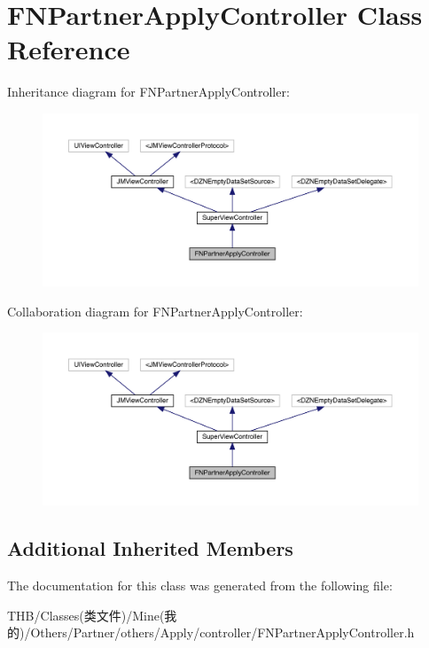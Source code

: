 \hypertarget{interface_f_n_partner_apply_controller}{}\section{F\+N\+Partner\+Apply\+Controller Class Reference}
\label{interface_f_n_partner_apply_controller}


Inheritance diagram for F\+N\+Partner\+Apply\+Controller\+:\nopagebreak
\begin{figure}[H]
\begin{center}
\leavevmode
\includegraphics[width=350pt]{interface_f_n_partner_apply_controller__inherit__graph}
\end{center}
\end{figure}


Collaboration diagram for F\+N\+Partner\+Apply\+Controller\+:\nopagebreak
\begin{figure}[H]
\begin{center}
\leavevmode
\includegraphics[width=350pt]{interface_f_n_partner_apply_controller__coll__graph}
\end{center}
\end{figure}
\subsection*{Additional Inherited Members}


The documentation for this class was generated from the following file\+:\begin{DoxyCompactItemize}
\item 
T\+H\+B/\+Classes(类文件)/\+Mine(我的)/\+Others/\+Partner/others/\+Apply/controller/F\+N\+Partner\+Apply\+Controller.\+h\end{DoxyCompactItemize}
